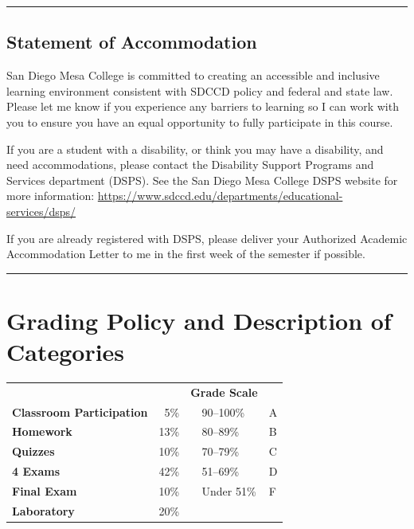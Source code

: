 \documentclass[12pt]{article}
\begin{document}
\medskip
\hrule

\subsection*{Statement of Accommodation}
San Diego Mesa College is committed to creating an accessible and inclusive learning environment consistent with SDCCD policy and federal and state law. 
Please let me know if you experience any barriers to learning so I can work with you to ensure you have an equal opportunity to fully participate in this course.

If you are a student with a disability, or think you may have a disability, and need accommodations, please contact the Disability Support Programs and Services department (DSPS). 
See the San Diego Mesa College DSPS website for more information: 
\url{https://www.sdccd.edu/departments/educational-services/dsps/}

If you are already registered with DSPS, please deliver your Authorized Academic Accommodation Letter to me in the first week of the semester if possible.

\medskip
\hrule

\section*{Grading Policy and Description of Categories}

\begin{center}
\begin{tabularx}{5in}{| >{\bfseries}l | r | X | l | l |}
\cline{1-2}\cline{4-5}
\multicolumn{2}{|c|}{\textbf{Grading Breakdown}} 
& \multicolumn{1}{c}{}%
& \multicolumn{2}{|c|}{\textbf{Grade Scale}} \\
\cline{1-2}\cline{4-5}
Classroom Participation & 5\%  & & 90--100\% & A \\
Homework                & 13\% & & 80--89\%  & B \\
Quizzes                 & 10\% & & 70--79\%  & C \\
4 Exams                 & 42\% & & 51--69\%  & D \\
Final Exam              & 10\% & & Under 51\% & F \\
Laboratory              & 20\% & &            &   \\
\cline{1-2}\cline{4-5}
\end{tabularx}
\end{center}
\end{document}
